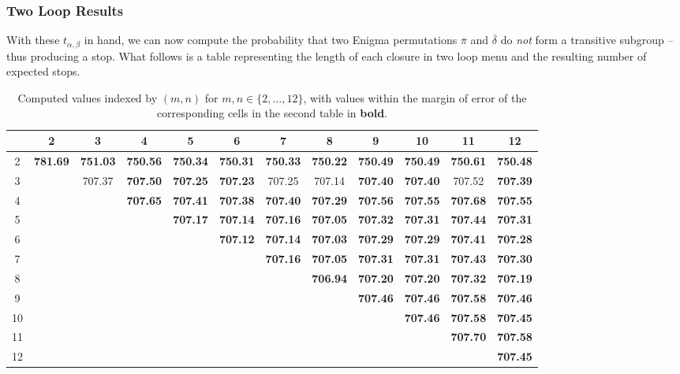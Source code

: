 \subsubsection{Two Loop Results}
With these $t_{\alpha, \beta}$ in hand, we can now compute the probability that two Enigma permutations $\overline\pi$ and $\overline\delta$ do \emph{not} form a transitive subgroup -- thus producing a stop. What follows is a table representing the length of each closure in two loop menu and the resulting number of expected stops. 
\begin{table}[h!]
\centering
\begin{adjustbox}{max width=\textwidth,max height=2\textheight}
\begin{tabular}{|c|c|c|c|c|c|c|c|c|c|c|c|}
\hline
 & 2 & 3 & 4 & 5 & 6 & 7 & 8 & 9 & 10 & 11 & 12 \\
\hline
2 & \textbf{781.69} & \textbf{751.03} & \textbf{750.56} & \textbf{750.34} & \textbf{750.31} & \textbf{750.33} & \textbf{750.22} & \textbf{750.49} & \textbf{750.49} & \textbf{750.61} & \textbf{750.48} \\
\hline
3 & & 707.37 & \textbf{707.50} & \textbf{707.25} & \textbf{707.23} & 707.25 & 707.14 & \textbf{707.40} & \textbf{707.40} & 707.52 & \textbf{707.39} \\
\hline
4 & & & \textbf{707.65} & \textbf{707.41} & \textbf{707.38} & \textbf{707.40} & \textbf{707.29} & \textbf{707.56} & \textbf{707.55} & \textbf{707.68} & \textbf{707.55} \\
\hline
5 & & & & \textbf{707.17} & \textbf{707.14} & \textbf{707.16} & \textbf{707.05} & \textbf{707.32} & \textbf{707.31} & \textbf{707.44} & \textbf{707.31} \\
\hline
6 & & & & & \textbf{707.12} & \textbf{707.14} & \textbf{707.03} & \textbf{707.29} & \textbf{707.29} & \textbf{707.41} & \textbf{707.28} \\
\hline
7 & & & & & & \textbf{707.16} & \textbf{707.05} & \textbf{707.31} & \textbf{707.31} & \textbf{707.43} & \textbf{707.30} \\
\hline
8 & & & & & & & \textbf{706.94} & \textbf{707.20} & \textbf{707.20} & \textbf{707.32} & \textbf{707.19} \\
\hline
9 & & & & & & & & \textbf{707.46} & \textbf{707.46} & \textbf{707.58} & \textbf{707.46} \\
\hline
10 & & & & & & & & & \textbf{707.46} & \textbf{707.58} & \textbf{707.45} \\
\hline
11 & & & & & & & & & & \textbf{707.70} & \textbf{707.58} \\
\hline
12 & & & & & & & & & & & \textbf{707.45} \\
\hline
\end{tabular}

\end{adjustbox}
\caption{Computed values indexed by $(m,n)$ for $m,n \in \{2,\dots,12\}$, with values within the margin of error of the corresponding cells in the second table in \textbf{bold}.}
\end{table}


